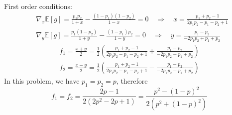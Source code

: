 \documentclass[a4paper, 8pt]{article}
\theoremstyle{definition}
\theoremstyle{hSol}
\begin{document}
First order conditions:
\begin{equation}
	\begin{split}
		&\nabla_{x} \mathbb{E}\left[g\right] = \frac{p_1p_2}{1+x} - \frac{(1-p_1)(1-p_2)}{1-x}=0\quad \Rightarrow\quad x=\frac{p_1+p_2 - 1}{2p_1p_2 -p_1 - p_2 + 1} \\
		&\nabla_y \mathbb{E}\left[g\right] = \frac{p_1(1-p_2)}{1+y} - \frac{(1-p_1)p_2}{1-y} =0\quad \Rightarrow\quad y = \frac{p_1 - p_2}{-2p_1p_2 + p_1 + p_2}
	\end{split}
\end{equation}
\begin{equation}
	\begin{split}
		f_1 = \frac{x+y}{2} = \frac{1}{2}\left(\frac{p_1+p_2 - 1}{2p_1p_2 -p_1 - p_2 + 1}+\frac{p_1 - p_2}{-2p_1p_2 + p_1 + p_2}\right) \\
		f_2 = \frac{x-y}{2} = \frac{1}{2}\left(\frac{p_1+p_2 - 1}{2p_1p_2 -p_1 - p_2 + 1}-\frac{p_1 - p_2}{-2p_1p_2 + p_1 + p_2}\right)
	\end{split}
\end{equation}
In this problem, we have $p_1 = p_2 = p$, therefore
\begin{equation}
	f_1 = f_2 = \frac{2p - 1}{2(2p^2-2p + 1)} = \frac{p^2 - (1-p)^2}{2(p^2 + (1-p)^2)}
\end{equation}
\end{document}
